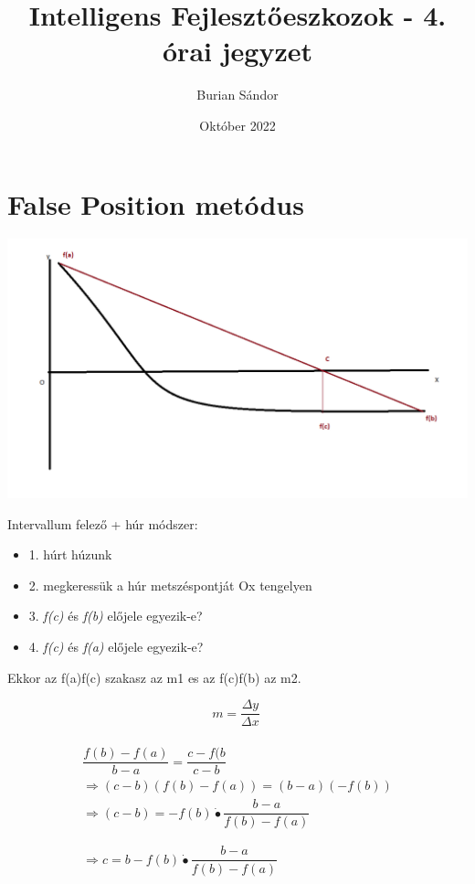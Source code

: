\documentclass{article}
\title{Intelligens Fejlesztőeszkozok - 4. órai jegyzet}
\author{Burian Sándor}
\date{Október 2022}
\begin{document}
\maketitle

\section{False Position metódus}

\includegraphics[scale=0.5]{../false_position.png} 

Intervallum felező + húr módszer:
\begin{itemize}
\item 1. húrt húzunk
\item 2. megkeressük a húr metszéspontját Ox tengelyen
\item 3. \textit{f(c) }és \textit{f(b)} előjele egyezik-e?
\item 4. \textit{f(c)} és \textit{f(a) }előjele egyezik-e?
\end{itemize}

Ekkor az f(a)f(c) szakasz az m1 es az f(c)f(b) az m2.

\begin{equation}
m = \dfrac{\Delta y}{\Delta x} \ 
\end{equation}

\begin{multline}
\\
\dfrac{f(b)-f(a)}{b-a} = \dfrac{c-f(b}{c-b}\\
\Rightarrow (c-b)(f(b)-f(a)) = (b-a)(-f(b)) \\
\Rightarrow (c-b) = -f(b) \dot{•} \dfrac{b-a}{f(b)-f(a)}\\
\\
\\
\Rightarrow c = b-f(b) \dot{•} \dfrac{b-a}{f(b)-f(a)}\\
\end{multline}
\end{document}
